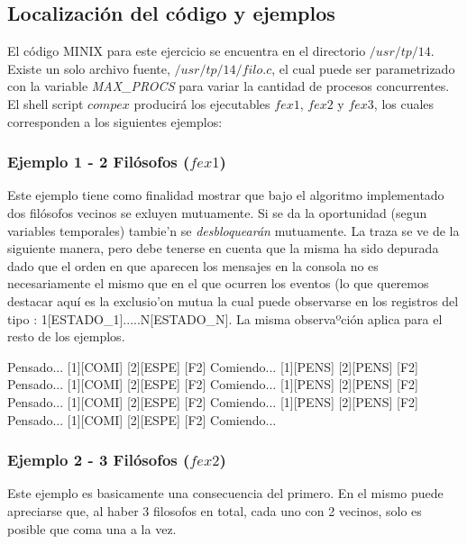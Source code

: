 \subsection{Localización del código y ejemplos}
El código MINIX para este ejercicio se encuentra en el directorio $/usr/tp/14$. Existe un solo archivo 
fuente,  $/usr/tp/14/filo.c$, el cual puede ser parametrizado con la variable \emph{MAX\_PROCS} para
variar la cantidad de procesos concurrentes. El shell script $compex$ producir\'a los ejecutables $fex1$, 
$fex2$ y $fex3$, los cuales corresponden a los siguientes ejemplos:

\subsubsection{Ejemplo 1 - 2 Fil\'osofos ($fex1$)}

Este ejemplo tiene como finalidad mostrar que bajo el algoritmo implementado dos fil\'osofos vecinos se exluyen 
mutuamente. Si se da la oportunidad (segun variables temporales) tambie'n se \textit{desbloquear\'an} mutuamente.
La traza se ve de la siguiente manera, pero debe tenerse en cuenta que la misma ha sido depurada
dado que el orden en que aparecen los mensajes en la consola no es necesariamente el mismo que
en el que ocurren los eventos (lo que queremos destacar aquí es la exclusio'on mutua la cual puede observarse
en los registros del tipo : 1[ESTADO\_1].....N[ESTADO\_N]. La misma observaºci\'on aplica para el resto de los ejemplos.

\begin{scriptsize} 
\begin{verbatimtab} 
[1][PENS]  [2][COMI]  
[F2] Pensado...
[1][COMI]  [2][ESPE]  
[F2] Comiendo...
[1][PENS]  [2][PENS]  
[F2] Pensado...
[1][COMI]  [2][ESPE]  
[F2] Comiendo...
[1][PENS]  [2][PENS]  
[F2] Pensado...
[1][COMI]  [2][ESPE]  
[F2] Comiendo...
[1][PENS]  [2][PENS]  
[F2] Pensado...
[1][COMI]  [2][ESPE]  
[F2] Comiendo...
\end{verbatimtab}
\end{scriptsize}

\subsubsection{Ejemplo 2 - 3 Fil\'osofos ($fex2$)}
Este ejemplo es basicamente una consecuencia del primero. En el mismo puede apreciarse que, al 
haber 3 filosofos en total, cada uno con 2 vecinos, solo es posible que coma una a la vez.

